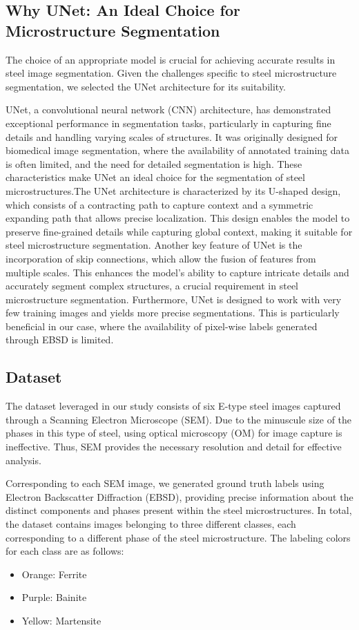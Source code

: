 \documentclass[]{article}
\begin{document}
\subsection{Why UNet: An Ideal Choice for Microstructure Segmentation}

The choice of an appropriate model is crucial for achieving accurate results in steel image segmentation. Given the challenges specific to steel microstructure segmentation, we selected the UNet architecture \cite{ronneberger2015unet} for its suitability.

UNet, a convolutional neural network (CNN) architecture, has demonstrated exceptional performance in segmentation tasks, particularly in capturing fine details and handling varying scales of structures. It was originally designed for biomedical image segmentation, where the availability of annotated training data is often limited, and the need for detailed segmentation is high. These characteristics make UNet an ideal choice for the segmentation of steel microstructures.The UNet architecture is characterized by its U-shaped design, which consists of a contracting path to capture context and a symmetric expanding path that allows precise localization. This design enables the model to preserve fine-grained details while capturing global context, making it suitable for steel microstructure segmentation. Another key feature of UNet is the incorporation of skip connections, which allow the fusion of features from multiple scales. This enhances the model's ability to capture intricate details and accurately segment complex structures, a crucial requirement in steel microstructure segmentation.
Furthermore, UNet is designed to work with very few training images and yields more precise segmentations. This is particularly beneficial in our case, where the availability of pixel-wise labels generated through EBSD is limited.

\subsection{Dataset}

The dataset leveraged in our study consists of six E-type steel images captured through a Scanning Electron Microscope (SEM). Due to the minuscule size of the phases in this type of steel, using optical microscopy (OM) for image capture is ineffective. Thus, SEM provides the necessary resolution and detail for effective analysis.

Corresponding to each SEM image, we generated ground truth labels using Electron Backscatter Diffraction (EBSD), providing precise information about the distinct components and phases present within the steel microstructures. In total, the dataset contains images belonging to three different classes, each corresponding to a different phase of the steel microstructure. The labeling colors for each class are as follows:
\begin{itemize}
	\item Orange: Ferrite
	\item Purple: Bainite
	\item Yellow: Martensite
\end{itemize}
\end{document}
